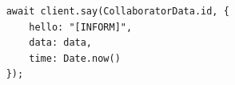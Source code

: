 \documentclass[10pt]{article}
\begin{document}
\begin{verbatim}
    await client.say(CollaboratorData.id, {
        hello: "[INFORM]",
        data: data,
        time: Date.now()
    });
\end{verbatim}

\end{document}
